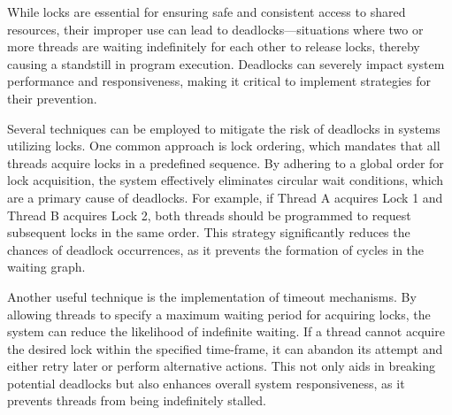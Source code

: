 While locks are essential for ensuring safe and consistent access to shared resources, their improper use can lead to deadlocks—situations where two or more threads are waiting indefinitely for each other to release locks, thereby causing a standstill in program execution. Deadlocks can severely impact system performance and responsiveness, making it critical to implement strategies for their prevention.

Several techniques can be employed to mitigate the risk of deadlocks in systems utilizing locks. One common approach is lock ordering, which mandates that all threads acquire locks in a predefined sequence. By adhering to a global order for lock acquisition, the system effectively eliminates circular wait conditions, which are a primary cause of deadlocks. For example, if Thread A acquires Lock 1 and Thread B acquires Lock 2, both threads should be programmed to request subsequent locks in the same order. This strategy significantly reduces the chances of deadlock occurrences, as it prevents the formation of cycles in the waiting graph.

Another useful technique is the implementation of timeout mechanisms. By allowing threads to specify a maximum waiting period for acquiring locks, the system can reduce the likelihood of indefinite waiting. If a thread cannot acquire the desired lock within the specified time-frame, it can abandon its attempt and either retry later or perform alternative actions. This not only aids in breaking potential deadlocks but also enhances overall system responsiveness, as it prevents threads from being indefinitely stalled.





